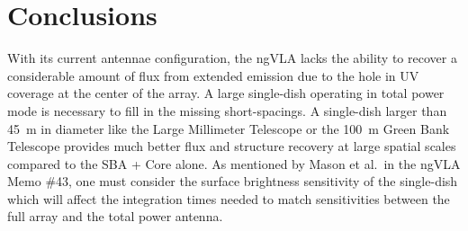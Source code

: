\documentclass[12pt]{article}
\begin{document}
\section*{Conclusions}

With its current antennae configuration, the ngVLA lacks the ability to recover a considerable amount of flux from extended emission due to the hole in UV coverage at the center of the array. A large single-dish operating in total power mode is necessary to fill in the missing short-spacings. A single-dish larger than \SI{45}{\meter} in diameter like the Large Millimeter Telescope or the \SI{100}{\meter} Green Bank Telescope provides much better flux and structure recovery at large spatial scales compared to the SBA + Core alone. As mentioned by Mason et al.~in the ngVLA Memo \#43, one must consider the surface brightness sensitivity of the single-dish which will affect the integration times needed to match sensitivities between the full array and the total power antenna. 
\end{document}
